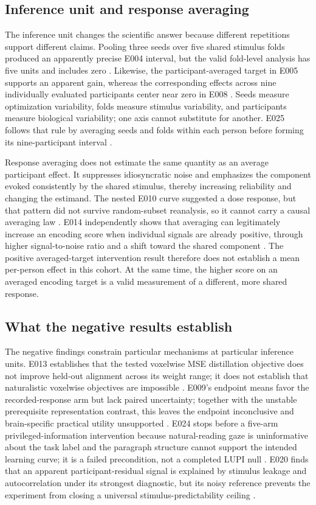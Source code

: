 \subsection{Inference unit and response averaging}

The inference unit changes the scientific answer because different repetitions support different claims.
Pooling three seeds over five shared stimulus folds produced an apparently precise E004 interval, but the valid fold-level analysis has five units and includes zero .
Likewise, the participant-averaged target in E005 supports an apparent gain, whereas the corresponding effects across nine individually evaluated participants center near zero in E008  .
Seeds measure optimization variability, folds measure stimulus variability, and participants measure biological variability; one axis cannot substitute for another.
E025 follows that rule by averaging seeds and folds within each person before forming its nine-participant interval .

Response averaging does not estimate the same quantity as an average participant effect.
It suppresses idiosyncratic noise and emphasizes the component evoked consistently by the shared stimulus, thereby increasing reliability and changing the estimand.
The nested E010 curve suggested a dose response, but that pattern did not survive random-subset reanalysis, so it cannot carry a causal averaging law .
E014 independently shows that averaging can legitimately increase an encoding score when individual signals are already positive, through higher signal-to-noise ratio and a shift toward the shared component .
The positive averaged-target intervention result therefore does not establish a mean per-person effect in this cohort.
At the same time, the higher score on an averaged encoding target is a valid measurement of a different, more shared response.

\subsection{What the negative results establish}

The negative findings constrain particular mechanisms at particular inference units.
E013 establishes that the tested voxelwise MSE distillation objective does not improve held-out alignment across its weight range; it does not establish that naturalistic voxelwise objectives are impossible .
E009's endpoint means favor the recorded-response arm but lack paired uncertainty; together with the unstable prerequisite representation contrast, this leaves the endpoint inconclusive and brain-specific practical utility unsupported .
E024 stops before a five-arm privileged-information intervention because natural-reading gaze is uninformative about the task label and the paragraph structure cannot support the intended learning curve; it is a failed precondition, not a completed LUPI null .
E020 finds that an apparent participant-residual signal is explained by stimulus leakage and autocorrelation under its strongest diagnostic, but its noisy reference prevents the experiment from closing a universal stimulus-predictability ceiling .

